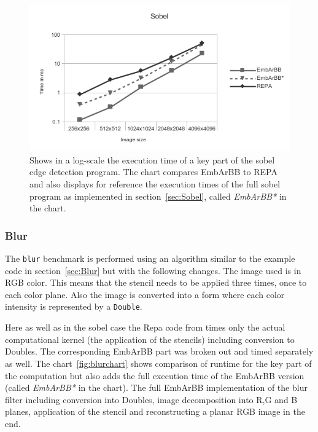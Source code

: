 \begin{figure}
\includegraphics[width=\linewidth]{./embarbb/img/sobelchart1}
\caption{Shows in a log-scale the execution time of a key part of the sobel edge 
         detection program. The chart compares EmbArBB to REPA and also displays 
         for reference the execution times of the full sobel program as implemented 
         in section~\ref{sec:Sobel}, called {\em EmbArBB*} in the chart.}
\label{fig:sobelchart1}
\end{figure}

\subsubsection{Blur}

The {\tt blur} benchmark is performed using an algorithm similar to the example 
code in section~\ref{sec:Blur} but with the following changes. The image used
is in RGB color. This means that the stencil needs to be applied three times, 
once to each color plane. Also the image is converted into a form 
where each color intensity is represented by a {\tt Double}. 

Here as well as in the sobel case the Repa code from 
times only the actual computational kernel (the application of the stencils) 
including conversion to Doubles. The corresponding EmbArBB part was broken 
out and timed separately as well. The chart~\ref{fig:blurchart} shows comparison
of runtime for the key part of the computation but also adds the full execution 
time of the EmbArBB version (called {\em EmbArBB*} in the chart). 
The full EmbArBB implementation of the blur filter including conversion into Doubles, 
image decomposition into R,G and B planes,  application of the stencil and
reconstructing a planar RGB image in the end.

